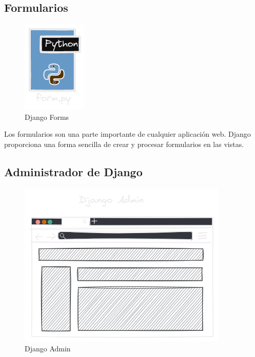 \documentclass[
  a4paper,
  DIV=11,
  numbers=noendperiod,
  onepage,
  openany]{scrreprt}
\begin{document}
\subsection{Formularios}\label{formularios}

\begin{figure}[H]

{\centering \includegraphics{images/python-form.png}

}

\caption{Django Forms}

\end{figure}%

Los formularios son una parte importante de cualquier aplicación web.
Django proporciona una forma sencilla de crear y procesar formularios en
las vistas.

\subsection{Administrador de Django}\label{administrador-de-django}

\begin{figure}[H]

{\centering \includegraphics{images/django-admin.png}

}

\caption{Django Admin}

\end{figure}%
\end{document}
